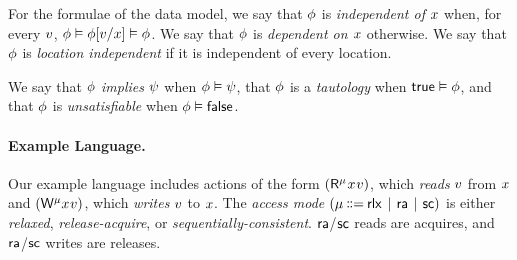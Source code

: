
For the formulae of the data model,
we say that $\phi$ is \emph{independent of $x$} when, for every $v$,
$\phi \vDash \phi[v/x] \vDash \phi$. We say that
$\phi$ is \emph{dependent on $x$} otherwise.  We say that $\phi$ is
\emph{location independent} if it is independent of every location.

We say that $\phi$ \emph{implies} $\psi$ when $\phi\vDash\psi$,
that $\phi$ is a \emph{tautology} when $\mathsf{true}\vDash\phi$, and that
$\phi$ is \emph{unsatisfiable} when $\phi\vDash\mathsf{false}$.

\paragraph{Example Language.}
Our example language includes actions of the form
$(\DR[\amode]{\aLoc}{\aVal})$, which \emph{reads}  $v$ from
$x$ and $(\DW[\amode]{\aLoc}{\aVal})$, which \emph{writes} $v$ to
$x$.
The \emph{access mode} $(\amode \!\!\BNFDEF\!\! \modeRLX \!\BNFSEP\! \modeRA \!\BNFSEP\! \modeSC)$ is
either \emph{relaxed}, \emph{release-acquire}, or
\emph{sequentially-consistent}.
${\mathsf{ra}}$/${\mathsf{sc}}$ reads are acquires, and ${\mathsf{ra}}$/${\mathsf{sc}}$ writes are releases.


